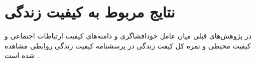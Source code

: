 \section{
    نتایج مربوط به کیفیت زندگی
}
در پژوهش‌های قبلی میان عامل خود‌افشاگری و
دامنه‌های کیفیت ارتباطات اجتماعی و کیفیت محیطی و
نمره کل کیفت زندگی در پرسشنامه کیفیت زندگی روابطی مشاهده شده است
\!\cite{chandraRelationshipPsychologicalMorbidity2003}
\!.



